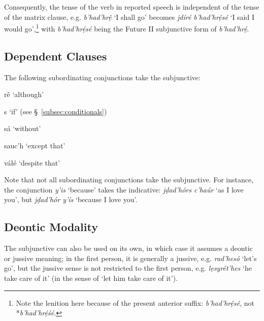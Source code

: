 \documentclass[a4paper, 12pt, twoside, openright, final]{book}
\newlength{\EnumItemSep} \EnumItemSep-3pt
\newenvironment { dlist } [1] [{}] {
    \vspace { -.5em }
    \begingroup
    \def\descriptionlabel ##1 {\hspace\labelsep \normalfont #1 ##1}
    \settowidth \leftmargini { 99.\hskip\labelsep }
    \begin { description }
    \itemsep \EnumItemSep
} {
    \end { description }
    \endgroup
    \vspace { -.5em }
}
\let \w \textit
\begin{document}
Consequently, the tense of the verb in reported speech is independent of the tense of the matrix clause, e.g.
\w{b’had’hrệ} ‘I shall go’ becomes \w{jdíré b’had’hrẹ́sé} ‘I said I would go’,\footnote{Note the lenition here because
of the present anterior suffix: \w{b’had’hrẹ́sé}, not *\w{b’had’hrẹ́śé}.} with \w{b’had’hrẹ́sé} being the Future II
subjunctive form of \w{b’had’hrẹ́}.

\subsection{Dependent Clauses}
The following subordinating conjunctions take the subjunctive:
 {
\begin{dlist}[\bfseries\itshape]
    \item[rê] ‘although’
    \item[s] ‘if’ (see §~\ref{subsec:conditionals})
    \item[sá] ‘without’
    \item[sauc’h] ‘except that’
    \item[váłé] ‘despite that’
\end{dlist}
}

\noindent Note that not all subordinating conjunctions take the subjunctive. For instance, the conjunction \w{y’is}
‘because’ takes the indicative: \w{jḍad’hórs c’haúr} ‘as I love you’, but \w{jḍad’hór y’ís} ‘because I love you’.

\subsection{Deontic Modality}
The subjunctive can also be used on its own, in which case it assumes a deontic or jussive meaning;
in the first person, it is generally a jussive, e.g. \w{rad’hesó} ‘let’s go’, but the jussive sense is not restricted
to the first person, e.g. \w{lẹsyrét’hes} ‘he take care of it’ (in the sense of ‘let him take care of it’).
\end{document}
